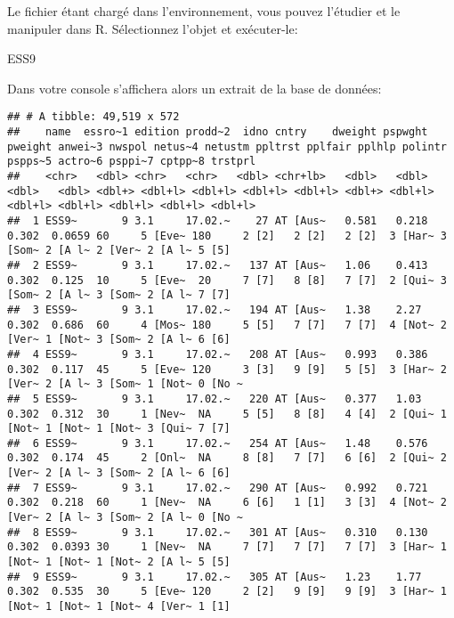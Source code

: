 \documentclass[
]{book}
\newenvironment{Shaded}{\begin{snugshade}}{\end{snugshade}}
\newcommand{\NormalTok}[1]{#1}
\begin{document}
Le fichier étant chargé dans l'environnement, vous pouvez l'étudier et le manipuler dans R. Sélectionnez l'objet et exécuter-le:

\begin{Shaded}
\begin{Highlighting}[]
\NormalTok{ESS9}
\end{Highlighting}
\end{Shaded}

Dans votre console s'affichera alors un extrait de la base de données:

\begin{verbatim}
## # A tibble: 49,519 x 572
##    name  essro~1 edition prodd~2  idno cntry    dweight pspwght pweight anwei~3 nwspol netus~4 netustm ppltrst pplfair pplhlp polintr pspps~5 actro~6 psppi~7 cptpp~8 trstprl
##    <chr>   <dbl> <chr>   <chr>   <dbl> <chr+lb>   <dbl>   <dbl>   <dbl>   <dbl> <dbl+> <dbl+l> <dbl+l> <dbl+l> <dbl+l> <dbl+> <dbl+l> <dbl+l> <dbl+l> <dbl+l> <dbl+l> <dbl+l>
##  1 ESS9~       9 3.1     17.02.~    27 AT [Aus~   0.581   0.218   0.302  0.0659 60     5 [Eve~ 180     2 [2]   2 [2]   2 [2]  3 [Har~ 3 [Som~ 2 [A l~ 2 [Ver~ 2 [A l~ 5 [5]  
##  2 ESS9~       9 3.1     17.02.~   137 AT [Aus~   1.06    0.413   0.302  0.125  10     5 [Eve~  20     7 [7]   8 [8]   7 [7]  2 [Qui~ 3 [Som~ 2 [A l~ 3 [Som~ 2 [A l~ 7 [7]  
##  3 ESS9~       9 3.1     17.02.~   194 AT [Aus~   1.38    2.27    0.302  0.686  60     4 [Mos~ 180     5 [5]   7 [7]   7 [7]  4 [Not~ 2 [Ver~ 1 [Not~ 3 [Som~ 2 [A l~ 6 [6]  
##  4 ESS9~       9 3.1     17.02.~   208 AT [Aus~   0.993   0.386   0.302  0.117  45     5 [Eve~ 120     3 [3]   9 [9]   5 [5]  3 [Har~ 2 [Ver~ 2 [A l~ 3 [Som~ 1 [Not~ 0 [No ~
##  5 ESS9~       9 3.1     17.02.~   220 AT [Aus~   0.377   1.03    0.302  0.312  30     1 [Nev~  NA     5 [5]   8 [8]   4 [4]  2 [Qui~ 1 [Not~ 1 [Not~ 1 [Not~ 3 [Qui~ 7 [7]  
##  6 ESS9~       9 3.1     17.02.~   254 AT [Aus~   1.48    0.576   0.302  0.174  45     2 [Onl~  NA     8 [8]   7 [7]   6 [6]  2 [Qui~ 2 [Ver~ 2 [A l~ 3 [Som~ 2 [A l~ 6 [6]  
##  7 ESS9~       9 3.1     17.02.~   290 AT [Aus~   0.992   0.721   0.302  0.218  60     1 [Nev~  NA     6 [6]   1 [1]   3 [3]  4 [Not~ 2 [Ver~ 2 [A l~ 3 [Som~ 2 [A l~ 0 [No ~
##  8 ESS9~       9 3.1     17.02.~   301 AT [Aus~   0.310   0.130   0.302  0.0393 30     1 [Nev~  NA     7 [7]   7 [7]   7 [7]  3 [Har~ 1 [Not~ 1 [Not~ 1 [Not~ 2 [A l~ 5 [5]  
##  9 ESS9~       9 3.1     17.02.~   305 AT [Aus~   1.23    1.77    0.302  0.535  30     5 [Eve~ 120     2 [2]   9 [9]   9 [9]  3 [Har~ 1 [Not~ 1 [Not~ 1 [Not~ 4 [Ver~ 1 [1]  

\end{verbatim}
\end{document}
